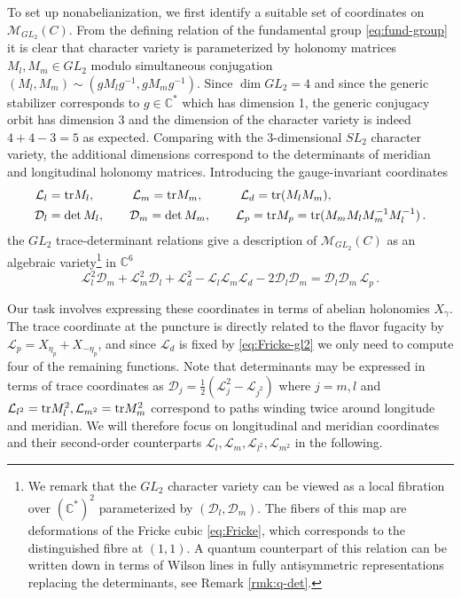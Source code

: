 \documentclass{article}
\numberwithin{equation}{section}
\newcommand{\IC}{\mathbb{C}}
\def\be{\begin{equation}}
\def\ee{\end{equation}}
\def\IC{{\mathbb{C}}}
\def\CL{\mathcal{L}}
\def\CD{{\mathcal{D}}}
\def\CM{{\mathcal{M}}}
\def\tr{{\rm{tr}}}
\begin{document}
To set up nonabelianization, we first identify a suitable set of coordinates on $\CM_{GL_2}(C)$.
From the defining relation of the fundamental group \eqref{eq:fund-group} it is clear that character variety is parameterized by holonomy matrices $M_l, M_m\in GL_2$ modulo simultaneous conjugation $(M_l, M_m)\sim (gM_lg^{-1}, gM_mg^{-1})$. 
Since $\dim GL_2=4$ and since the generic stabilizer corresponds to $g\in\IC^*$ which has dimension 1,  the generic conjugacy orbit has dimension $3$ and the dimension of the character variety is indeed $4+4-3=5$ as expected.
Comparing with the 3-dimensional $SL_2$ character variety, the additional dimensions correspond to the determinants of meridian and longitudinal holonomy matrices.
Introducing the gauge-invariant coordinates
\be\label{eq:gl2-trace-coordinates}
\begin{split}
	\CL_{l} &= \tr M_l,\qquad
	\ \ \ \CL_{m} = \tr M_m, \qquad
	\ \ \ \CL_{d} = \tr (M_l M_m),
	\\
	\CD_{l} &= \det M_l,\qquad
	\CD_{m} = \det M_m,\qquad
	\CL_{p} = \tr M_p = \tr (M_m M_l M_m^{-1} M_l^{-1})\,.
\end{split}
\ee
the $GL_2$ trace-determinant relations give a description of $\CM_{GL_2}(C)$ as an algebraic variety\footnote{
We remark that the ${GL}_{2}$ character variety can be viewed as a local fibration over $(\IC^*)^2$ parameterized by $(\CD_l,\CD_m)$. The fibers of this map are deformations of the Fricke cubic \eqref{eq:Fricke}, which corresponds to the distinguished fibre at $(1,1)$.
A quantum counterpart of this relation can be written down in terms of Wilson lines in fully antisymmetric representations replacing the determinants, see Remark \ref{rmk:q-det}.
} in $\IC^6$
\be\label{eq:Fricke-gl2}
	\CL_{l}^2\CD_m +\CL_{m}^2\CD_l+\CL_{d}^2 - \CL_{l}\CL_{m}\CL_{d}-2\CD_{l}\CD_m = \CD_{l}\CD_m \,\CL_p\,.
\ee

Our task involves expressing these coordinates in terms of abelian holonomies $X_\gamma$.
The trace coordinate at the puncture is directly related to the flavor fugacity by $\CL_p = X_{\eta_p}+X_{-\eta_p}$, and 
since $\CL_d$ is fixed by \eqref{eq:Fricke-gl2} we only need to compute four of the remaining functions. 
Note that determinants may be expressed in terms of trace coordinates as 
$\CD_j = \frac{1}{2}(\CL_{j}^2 - \CL_{j^2})$ where $j=m,l$ and $\CL_{l^2} = \tr M_l^2, \CL_{m^2} = \tr M_{m}^2$
correspond to paths winding twice around longitude and meridian.
We will therefore focus on longitudinal and meridian coordinates and their second-order counterparts $\CL_{l}, \CL_{m}, \CL_{l^2}, \CL_{m^2}$ in the following. 
\end{document}
